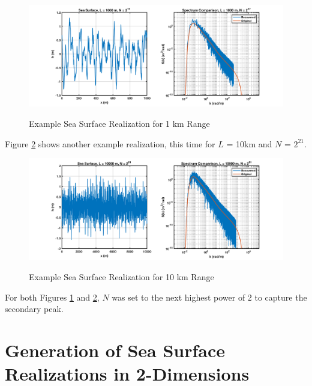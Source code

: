 \begin{figure}[H]
  \begin{center}
\includegraphics[width=6in]{../media/Ocean_Surface/sea_surface_1000.png}
  \end{center}
  \renewcommand{\baselinestretch}{1} \small\normalsize
  \begin{quote}
    \caption[Example Sea Surface Realization for 1 km Range]{Example Sea Surface Realization for 1 km Range\label{os_fig:7a}}
  \end{quote}
\end{figure}
\renewcommand{\baselinestretch}{2} \small\normalsize

Figure \ref{os_fig:7aa} shows another example realization, this time for $L$ = 10km and $N$ = $2^{21}$. 
\begin{figure}[H]
  \begin{center}
\includegraphics[width=6in]{../media/Ocean_Surface/sea_surface_10000.png}
  \end{center}
  \renewcommand{\baselinestretch}{1} \small\normalsize
  \begin{quote}
    \caption[Example Sea Surface Realization for 10 km Range]{Example Sea Surface Realization for 10 km Range\label{os_fig:7aa}}
  \end{quote}
\end{figure}
\renewcommand{\baselinestretch}{2} \small\normalsize
For both Figures \ref{os_fig:7a} and \ref{os_fig:7aa}, $N$ was set to the next highest power of 2 to capture the secondary peak.

\section{Generation of Sea Surface Realizations in 2-Dimensions}
